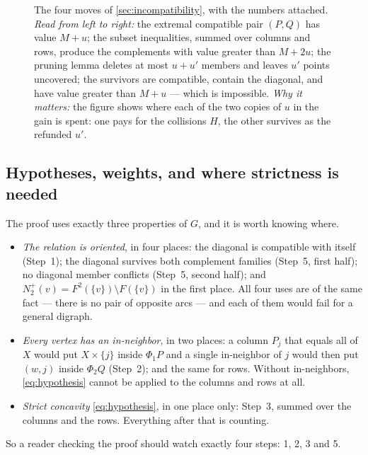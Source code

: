 \begin{figure}[t]
\centering

\caption{The four moves of \cref{sec:incompatibility}, with the numbers attached. \emph{Read from
 left to right:} the extremal compatible pair $(P,Q)$ has value $M+u$; the subset inequalities,
 summed over columns and rows, produce the complements with value greater than $M+2u$; the pruning
 lemma deletes at most $u+u'$ members and leaves $u'$ points uncovered; the survivors are compatible,
 contain the diagonal, and have value greater than $M+u$ --- which is impossible. \emph{Why it
 matters:} the figure shows where each of the two copies of $u$ in the gain is spent: one pays for
 the collisions $H$, the other survives as the refunded $u'$.}
\label{fig:extremal}
\end{figure}

\subsection{Hypotheses, weights, and where strictness is needed}\label{sec:remarks4}

\begin{remark}\label{rem:hypotheses}
The proof uses exactly three properties of $G$, and it is worth knowing where.
\begin{itemize}[leftmargin=1.4em,itemsep=2pt,topsep=1pt]
\item \emph{The relation is oriented}, in four places: the diagonal is compatible with itself
 (Step~1); the diagonal survives both complement families (Step~5, first half); no diagonal member
 conflicts (Step~5, second half); and $N_2^+(v)=F^2(\{v\})\setminus F(\{v\})$ in the first place.
 All four uses are of the same fact --- there is no pair of opposite arcs --- and each of them would
 fail for a general digraph.
\item \emph{Every vertex has an in-neighbor}, in two places: a column $P_j$ that equals all of $X$
 would put $X\times\{j\}$ inside $\Phi_1P$ and a single in-neighbor of $j$ would then put $(w,j)$
 inside $\Phi_2Q$ (Step~2); and the same for rows. Without in-neighbors, \eqref{eq:hypothesis} cannot
 be applied to the columns and rows at all.
\item \emph{Strict concavity} \eqref{eq:hypothesis}, in one place only: Step~3, summed over the
 columns and the rows. Everything after that is counting.
\end{itemize}
So a reader checking the proof should watch exactly four steps: 1, 2, 3 and 5.
\end{remark}

